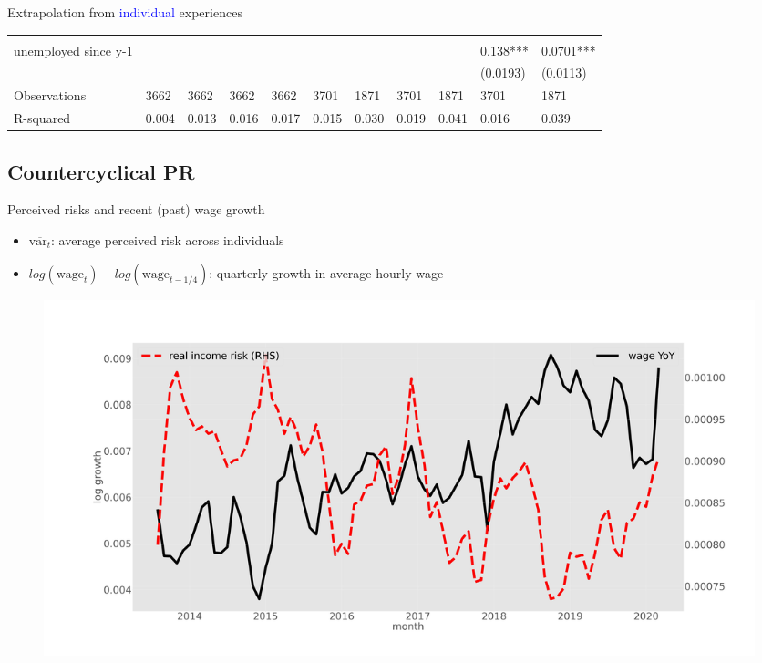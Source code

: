 \documentclass{beamer}
\begin{document}
\begin{frame}{Extrapolation from \textcolor{blue}{individual} experiences}
\begin{table}
{\begin{tabular}{lllllllllll}
				&           &           &           &           &            &            &            &            &            &            \\
				unemployed since y-1&           &           &           &           &            &            &            &            & 0.138***   & 0.0701***  \\
				&           &           &           &           &            &            &            &            & (0.0193)   & (0.0113)   \\
				Observations                          & 3662      & 3662      & 3662      & 3662      & 3701       & 1871       & 3701       & 1871       & 3701       & 1871       \\
				R-squared                             & 0.004     & 0.013     & 0.016     & 0.017     & 0.015      & 0.030      & 0.019      & 0.041      & 0.016      & 0.039      \\
				\hline 
			\end{tabular}
		}
	\end{table}
\end{frame}


\subsection{Countercyclical PR}


\begin{frame}{Perceived risks and recent (past) wage growth}
\label{tsMean3mvrvar_he}
	\begin{itemize}
		\item $\overline{\text{var}_{t}} $: average perceived risk across individuals
		\item  $log(\text{wage}_t) - log(\text{wage}_{t-1/4})$: quarterly growth in average hourly wage
	\end{itemize}
	\begin{figure}
		\centering
		\label{ts_var}
		\includegraphics[width=\textwidth]{figures/tsMean3mvrvar_he.jpg}
	\end{figure}
	\quad  \hyperlink{appendix:tsMean3mvrexp_he}{} 
\end{frame}
\end{document}
